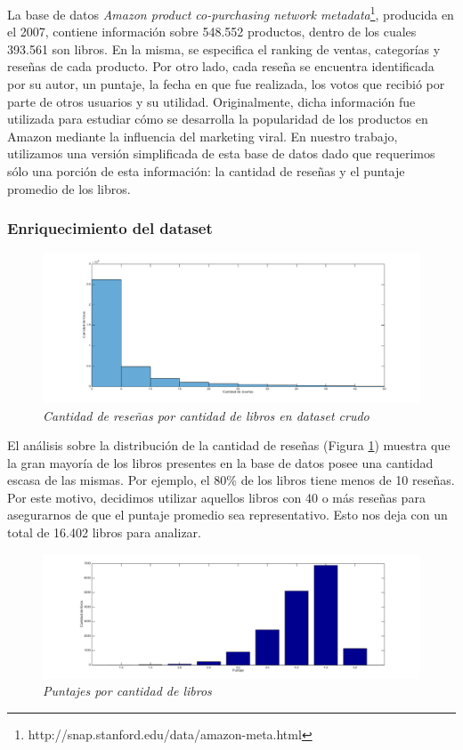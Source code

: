 \documentclass[12pt,journal,compsoc]{IEEEtran}
\begin{document}
La base de datos \textit{Amazon product co-purchasing network metadata}\footnote{http://snap.stanford.edu/data/amazon-meta.html}, producida en el 2007, contiene información sobre 548.552 productos, dentro de los cuales 393.561 son libros. En la misma, se especifica el ranking de ventas, categorías y reseñas de cada producto. Por otro lado, cada reseña se encuentra identificada por su autor, un puntaje, la fecha en que fue realizada, los votos que recibió por parte de otros usuarios y su utilidad. Originalmente, dicha información fue utilizada para estudiar cómo se desarrolla la popularidad de los productos en Amazon mediante la influencia del marketing viral\cite{leskovec}. En nuestro trabajo, utilizamos una versión simplificada de esta base de datos dado que requerimos sólo una porción de esta información: la cantidad de reseñas y el puntaje promedio de los libros.

\subsubsection{Enriquecimiento del dataset}
\begin{figure}[H]
  \centering
  \includegraphics[width=6.5in]{imgs/cantResenasVsCantLibros.png}
  \caption{\small \textit{Cantidad de reseñas por cantidad de libros en dataset crudo}}
  \label{fig:cantResVsCantLibros}
\end{figure} 

El análisis sobre la distribución de la cantidad de reseñas (Figura \ref{fig:cantResVsCantLibros}) muestra que la gran mayoría de los libros presentes en la base de datos posee una cantidad escasa de las mismas. Por ejemplo, el 80\% de los libros tiene menos de 10 reseñas. Por este motivo, decidimos utilizar aquellos libros con 40 o más reseñas para asegurarnos de que el puntaje promedio sea representativo. Esto nos deja con un total de 16.402 libros para analizar.

\begin{figure}[H]
  \centering
  \includegraphics[width=6.5in]{imgs/cantidadDeLibrosVsPuntaje.png}
  \caption{\small \textit{Puntajes por cantidad de libros}}
  \label{fig:cantLibrosVsPuntaje}
\end{figure} 
\end{document}
